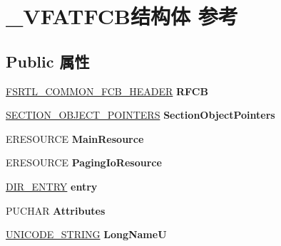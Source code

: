 \hypertarget{struct___v_f_a_t_f_c_b}{}\section{\+\_\+\+V\+F\+A\+T\+F\+C\+B结构体 参考}
\label{struct___v_f_a_t_f_c_b}
\subsection*{Public 属性}
\begin{DoxyCompactItemize}
\item 
\mbox{\label{struct___v_f_a_t_f_c_b_a946846fbf13b7648da3361d5ce88ee23}} 
\hyperlink{struct___f_s_r_t_l___c_o_m_m_o_n___f_c_b___h_e_a_d_e_r}{F\+S\+R\+T\+L\+\_\+\+C\+O\+M\+M\+O\+N\+\_\+\+F\+C\+B\+\_\+\+H\+E\+A\+D\+ER} {\bfseries R\+F\+CB}
\item 
\mbox{\label{struct___v_f_a_t_f_c_b_aeb2d095a68edcdb73ca7f91ef20f101b}} 
\hyperlink{struct___s_e_c_t_i_o_n___o_b_j_e_c_t___p_o_i_n_t_e_r_s}{S\+E\+C\+T\+I\+O\+N\+\_\+\+O\+B\+J\+E\+C\+T\+\_\+\+P\+O\+I\+N\+T\+E\+RS} {\bfseries Section\+Object\+Pointers}
\item 
\mbox{\label{struct___v_f_a_t_f_c_b_adb53d3061b3816ff5a1d4abf00524ef9}} 
E\+R\+E\+S\+O\+U\+R\+CE {\bfseries Main\+Resource}
\item 
\mbox{\label{struct___v_f_a_t_f_c_b_a736c4915426729018eb071ef8f53365f}} 
E\+R\+E\+S\+O\+U\+R\+CE {\bfseries Paging\+Io\+Resource}
\item 
\mbox{\label{struct___v_f_a_t_f_c_b_adb4498bd96c4122ae1188ed2e81312bd}} 
\hyperlink{union___d_i_r___e_n_t_r_y}{D\+I\+R\+\_\+\+E\+N\+T\+RY} {\bfseries entry}
\item 
\mbox{\label{struct___v_f_a_t_f_c_b_aafb4d32184ba5af64b64406eeb4b8a61}} 
P\+U\+C\+H\+AR {\bfseries Attributes}
\item 
\mbox{\label{struct___v_f_a_t_f_c_b_af97ef835b3d23e7fef104953b721b363}} 
\hyperlink{struct___u_n_i_c_o_d_e___s_t_r_i_n_g}{U\+N\+I\+C\+O\+D\+E\+\_\+\+S\+T\+R\+I\+NG} {\bfseries Long\+NameU}

\end{DoxyCompactItemize}
